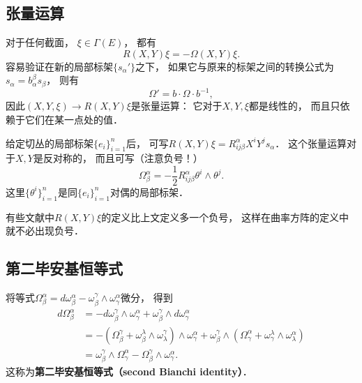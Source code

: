 \subsection{张量运算}
对于任何截面， $\xi\in\Gamma(E)$， 都有
$$
R(X,Y)\xi=-\Omega(X,Y)\xi.
$$
容易验证在新的局部标架$\{s_\alpha'\}$之下， 如果它与原来的标架之间的转换公式为$s_\alpha=b_\alpha^\beta s_\beta$， 则有
$$
\Omega'=b\cdot\Omega \cdot b^{-1},
$$
因此$(X,Y,\xi)\to R(X,Y)\xi$是张量运算： 它对于$X,Y,\xi$都是线性的， 而且只依赖于它们在某一点处的值． 

给定切丛的局部标架$\{e_i\}_{i=1}^n$后， 可写$R(X,Y)\xi=R^\alpha_{ij\beta}X^iY^js_\alpha$． 这个张量运算对于$X,Y$是反对称的， 而且可写（注意负号！）
$$
\Omega_\beta^\alpha=-\frac{1}{2}R^\alpha_{ij\beta}\theta^i\wedge\theta^j.
$$
这里$\{\theta^i\}_{i=1}^n$是同$\{e_i\}_{i=1}^n$对偶的局部标架．

有些文献中$R(X,Y)\xi$的定义比上文定义多一个负号， 这样在曲率方阵的定义中就不必出现负号．

\subsection{第二毕安基恒等式}
将等式$\Omega_\beta^\alpha=d\omega_\beta^\alpha-\omega_\beta^\gamma\wedge\omega_\gamma^\alpha$微分， 得到
$$
\begin{aligned}
d\Omega_\beta^\alpha&=-d\omega_\beta^\gamma\wedge\omega_\gamma^\alpha+\omega_\beta^\gamma\wedge d\omega_\gamma^\alpha\\
&=-(\Omega_\beta^\gamma+\omega_\beta^\lambda\wedge\omega_\lambda^\gamma)\wedge\omega_\gamma^\alpha
+\omega_\beta^\gamma\wedge(\Omega_\gamma^\alpha+\omega_\gamma^\lambda\wedge\omega_\lambda^\alpha)\\
&=\omega_\beta^\gamma\wedge\Omega_\gamma^\alpha-\Omega_\beta^\gamma\wedge\omega_\gamma^\alpha.
\end{aligned}
$$
这称为\textbf{第二毕安基恒等式（second Bianchi identity）}．
